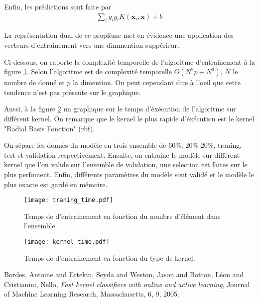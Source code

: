 \documentclass{article}%
\begin{document}
Enfin, les prédictions sont faite par 
\begin{align*}
    \sum_{i} y_i g_i K(\mathbf{x}_i, \mathbf{x}) + b
\end{align*}

La représentation dual de ce proplème met en évidence une application des vecteurs d'entrainement vers une dimmention suppérieur.

Ci-dessous, on raporte la complexité temporelle de l'algoritme d'entrainement à la figure  \ref{fig:traning}. Selon \cite{bordes2005fast} l'algoritme est de complexité temporelle $O(N^2 p + N^3)$, $N$ le nombre de donné et $p$ la dimention. On peut cependant dire à l'oeil que cette tendence n'est pas présente sur le graphique.

Aussi, à la figure \ref{fig:kernel} un graphique sur le temps d'éxécution de l'algoritme sur différent kernel. On remarque que le kernel le plus rapide d'éxécution est le kernel "Radial Basis Fonction" (rbf).

On sépare les donnés du modèle en trois ensemble de 60\%, 20\% 20\%, traning, test et validation respectivement. Ensuite, on entraine le modèle sur différent kernel que l'on valide sur l'ensemble de validation, une selection est faites sur le plus perfoment. Enfin, différents paramètres du modèle sont validé et le modèle le plus exacte est gardé en mémoire.

\begin{figure}[h]
\centering
\texttt{[image: traning\_time.pdf]}
\caption{\label{fig:traning} Temps de d'entrainement en fonction du nombre d'élément dans l'ensemble.}
\end{figure}

\begin{figure}[h]
\centering
\texttt{[image: kernel\_time.pdf]}
\caption{\label{fig:kernel} Temps de d'entrainement en fonction du type de kernel.}
\end{figure}

\begin{thebibliography}{9}

  Bordes, Antoine and Ertekin, Seyda and Weston, Jason and Botton, L{\'e}on and Cristianini, Nello,
  \textit{Fast kernel classifiers with online and active learning},
  Journal of Machine Learning Research, Massachusetts,
  6, 9,
  2005.

\end{thebibliography}

%
\end{document}
